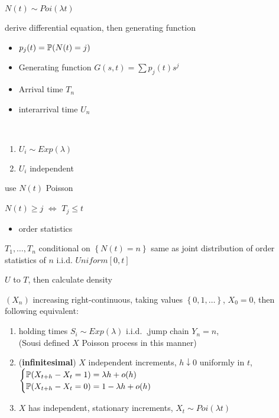 \begin{thm}
    $N(t) \sim Poi(\lambda t)$
\end{thm}
\begin{pf}
    derive differential equation, then generating function
\end{pf}

\begin{itemize}
    \item $p_j(t) = \mathbb{P}(N(t) = j)$
    \item Generating function $G(s, t) = \sum p_j(t)s^j$
    \item Arrival time $T_n$
    \item interarrival time $U_n$
\end{itemize}

\begin{thm}\,
    \begin{enumerate}
        \item $U_i \sim Exp(\lambda)$
        \item $U_i$ independent
    \end{enumerate}
\end{thm}
\begin{pf}
    use $N(t)$ Poisson
\end{pf}

\begin{fact}
    $N(t) \geq j$ $\iff$ $T_j \leq t$
\end{fact}
\begin{itemize}
    \item order statistics
\end{itemize}

\begin{thm}
    $T_1, \dots, T_n$ conditional on $\left\{ N(t) = n \right\}$ same as joint distribution of order statistics of $n$ i.i.d. $Uniform[0, t]$
\end{thm}
\begin{pf}
    $U$ to $T$, then calculate density
\end{pf}

\begin{thm}
    $(X_n)$ increasing right-continuous, taking values $\left\{ 0, 1, \dots \right\}$, $X_0 = 0$, then following equivalent:
    \begin{enumerate}
        \item holding times $S_i \sim Exp(\lambda)$ i.i.d.\ ,jump chain $Y_n = n$,\\ (Sousi defined $X$ Poisson process in this manner)
        \item (\textbf{infinitesimal}) $X$ independent increments, $h \downarrow 0$ uniformly in $t$,\\ $
        \begin{cases}
            \mathbb{P}(X_{t+h} - X_t = 1) = \lambda h + o(h)\\
            \mathbb{P}(X_{t+h} - X_t = 0) = 1 - \lambda h + o(h)
        \end{cases}$
        \item $X$ has independent, stationary increments, $X_t \sim Poi(\lambda t)$
    \end{enumerate}
\end{thm}

